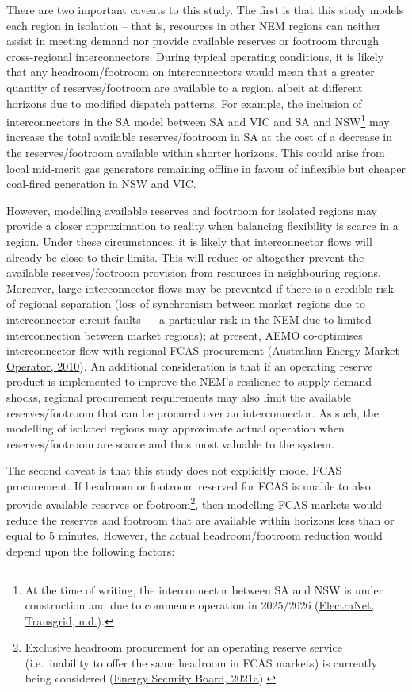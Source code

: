 \documentclass[12pt,a4paper,]{report}
\begin{document}
There are two important caveats to this study. The first is that this
study models each region in isolation -- that is, resources in other NEM
regions can neither assist in meeting demand nor provide available
reserves or footroom through cross-regional interconnectors. During
typical operating conditions, it is likely that any headroom/footroom on
interconnectors would mean that a greater quantity of reserves/footroom
are available to a region, albeit at different horizons due to modified
dispatch patterns. For example, the inclusion of interconnectors in the
SA model between SA and VIC and SA and NSW\footnote{At the time of
  writing, the interconnector between SA and NSW is under construction
  and due to commence operation in 2025/2026
  (\protect\hyperlink{ref-electranettransgridProjectEnergyConnect}{ElectraNet,
  Transgrid, n.d.}).} may increase the total available reserves/footroom
in SA at the cost of a decrease in the reserves/footroom available
within shorter horizons. This could arise from local mid-merit gas
generators remaining offline in favour of inflexible but cheaper
coal-fired generation in NSW and VIC.

However, modelling available reserves and footroom for isolated regions
may provide a closer approximation to reality when balancing flexibility
is scarce in a region. Under these circumstances, it is likely that
interconnector flows will already be close to their limits. This will
reduce or altogether prevent the available reserves/footroom provision
from resources in neighbouring regions. Moreover, large interconnector
flows may be prevented if there is a credible risk of regional
separation (loss of synchronism between market regions due to
interconnector circuit faults --- a particular risk in the NEM due to
limited interconnection between market regions); at present, AEMO
co-optimises interconnector flow with regional FCAS procurement
(\protect\hyperlink{ref-australianenergymarketoperatorConstraintFormulationGuidelines2010}{Australian
Energy Market Operator, 2010}). An additional consideration is that if
an operating reserve product is implemented to improve the NEM's
resilience to supply-demand shocks, regional procurement requirements
may also limit the available reserves/footroom that can be procured over
an interconnector. As such, the modelling of isolated regions may
approximate actual operation when reserves/footroom are scarce and thus
most valuable to the system.

The second caveat is that this study does not explicitly model FCAS
procurement. If headroom or footroom reserved for FCAS is unable to also
provide available reserves or footroom\footnote{Exclusive headroom
  procurement for an operating reserve service (i.e.~inability to offer
  the same headroom in FCAS markets) is currently being considered
  (\protect\hyperlink{ref-energysecurityboardPost2025Market2021}{Energy
  Security Board, 2021a}).}, then modelling FCAS markets would reduce
the reserves and footroom that are available within horizons less than
or equal to 5 minutes. However, the actual headroom/footroom reduction
would depend upon the following factors:
\end{document}
